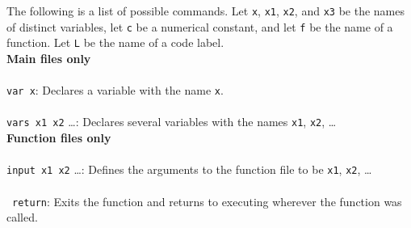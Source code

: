 \documentclass{report}
\begin{document}
The following is a list of possible commands. Let \texttt{x}, \texttt{x1}, \texttt{x2}, and \texttt{x3} be the names of distinct variables, let \texttt{c} be a numerical constant, and let \texttt{f} be the name of a function. Let \texttt{L} be the name of a code label. \\

\textbf{Main files only} \\ \\
\texttt{var x}: Declares a variable with the name \texttt{x}. \\ \\
\texttt{vars x1 x2} \dots: Declares several variables with the names \texttt{x1}, \texttt{x2}, \dots \\

\textbf{Function files only} \\ \\
\texttt{input x1 x2} \dots: Defines the arguments to the function file to be \texttt{x1}, \texttt{x2}, \dots \\ \\\
\texttt{return}: Exits the function and returns to executing wherever the function was called. \\
\end{document}
